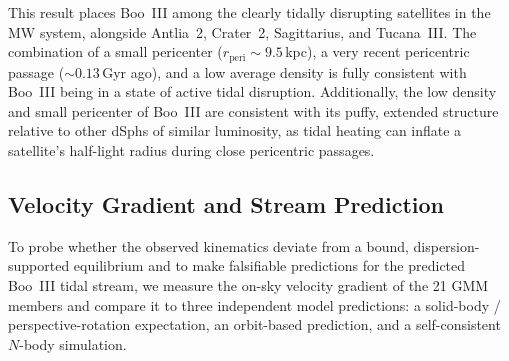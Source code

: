\documentclass[twocolumn, apj, numberedappendix, appendixfloats]{openjournal_dhayaa}
\begin{document}
This result places Boo~III among the clearly tidally disrupting satellites in the MW system, alongside Antlia~2, Crater~2, Sagittarius, and Tucana~III. The combination of a small pericenter ($r_{\mathrm{peri}} \sim 9.5$\,kpc), a very recent pericentric passage ($\sim 0.13$\,Gyr ago), and a low average density is fully consistent with Boo~III being in a state of active tidal disruption. Additionally, the low density and small pericenter of Boo~III are consistent with its puffy, extended structure relative to other dSphs of similar luminosity, as tidal heating can inflate a satellite's half-light radius during close pericentric passages.

\subsection{Velocity Gradient and Stream Prediction} \label{section:gradient}

To probe whether the observed kinematics deviate from a bound, dispersion-supported equilibrium and to make falsifiable predictions for the predicted Boo~III tidal stream, we measure the on-sky velocity gradient of the 21 GMM members and compare it to three independent model predictions: a solid-body / perspective-rotation expectation, an orbit-based prediction, and a self-consistent $N$-body simulation.  
\end{document}
